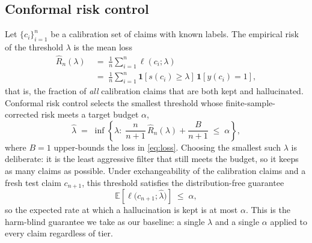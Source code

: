 \subsection{Conformal risk control}
\label{sec:crc}
Let $\{c_i\}_{i=1}^{n}$ be a calibration set of claims with known labels. The
empirical risk of the threshold $\lambda$ is the mean loss
\begin{equation}
\begin{aligned}
\widehat{R}_n(\lambda) &\;=\; \frac{1}{n} \sum_{i=1}^{n} \ell(c_i; \lambda)\\
&\;=\; \frac{1}{n} \sum_{i=1}^{n}
\mathbf{1}\!\left[s(c_i) \ge \lambda\right]\,\mathbf{1}\!\left[y(c_i) = 1\right],
\end{aligned}
\label{eq:emp-risk}
\end{equation}
that is, the fraction of \emph{all} calibration claims that are both kept and
hallucinated. Conformal risk control \citep{angelopoulos2024crc} selects the
smallest threshold whose finite-sample-corrected risk meets a target budget
$\alpha$,
\begin{equation}
\widehat{\lambda} \;=\; \inf\left\{ \lambda :\;
\frac{n}{n+1}\,\widehat{R}_n(\lambda) + \frac{B}{n+1} \;\le\; \alpha \right\},
\label{eq:crc-threshold}
\end{equation}
where $B = 1$ upper-bounds the loss in \eqref{eq:loss}. Choosing the smallest such
$\lambda$ is deliberate: it is the least aggressive filter that still meets the
budget, so it keeps as many claims as possible. Under exchangeability of the
calibration claims and a fresh test claim $c_{n+1}$, this threshold satisfies the
distribution-free guarantee
\begin{equation}
\mathbb{E}\!\left[\ell\big(c_{n+1}; \widehat{\lambda}\big)\right] \;\le\; \alpha,
\label{eq:crc-guarantee}
\end{equation}
so the expected rate at which a hallucination is kept is at most $\alpha$. This is
the harm-blind guarantee we take as our baseline: a single $\lambda$ and a single
$\alpha$ applied to every claim regardless of tier.
